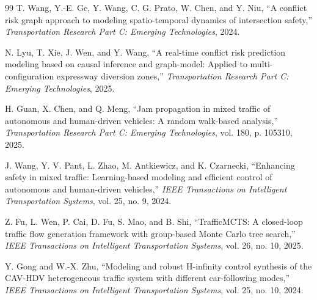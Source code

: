 \documentclass[UTF8,zihao=5,a4paper]{ctexart}
\begin{document}
\begingroup
\footnotesize
\begin{thebibliography}{99}
T. Wang, Y.-E. Ge, Y. Wang, C. G. Prato, W. Chen, and Y. Niu,
``A conflict risk graph approach to modeling spatio-temporal dynamics of intersection safety,''
\emph{Transportation Research Part C: Emerging Technologies}, 2024.

N. Lyu, T. Xie, J. Wen, and Y. Wang,
``A real-time conflict risk prediction modeling based on causal inference and graph-model: Applied to multi-configuration expressway diversion zones,''
\emph{Transportation Research Part C: Emerging Technologies}, 2025.

H. Guan, X. Chen, and Q. Meng,
``Jam propagation in mixed traffic of autonomous and human-driven vehicles: A random walk-based analysis,''
\emph{Transportation Research Part C: Emerging Technologies}, vol. 180, p. 105310, 2025.

J. Wang, Y. V. Pant, L. Zhao, M. Antkiewicz, and K. Czarnecki,
``Enhancing safety in mixed traffic: Learning-based modeling and efficient control of autonomous and human-driven vehicles,''
\emph{IEEE Transactions on Intelligent Transportation Systems}, vol. 25, no. 9, 2024.

Z. Fu, L. Wen, P. Cai, D. Fu, S. Mao, and B. Shi,
``TrafficMCTS: A closed-loop traffic flow generation framework with group-based Monte Carlo tree search,''
\emph{IEEE Transactions on Intelligent Transportation Systems}, vol. 26, no. 10, 2025.

Y. Gong and W.-X. Zhu,
``Modeling and robust H-infinity control synthesis of the CAV-HDV heterogeneous traffic system with different car-following modes,''
\emph{IEEE Transactions on Intelligent Transportation Systems}, vol. 25, no. 10, 2024.
\end{thebibliography}
\endgroup
\end{document}
